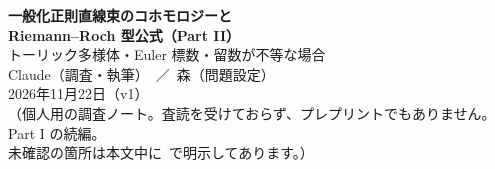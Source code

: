 

\sloppy
\begin{center}
{\LARGE\bfseries\sffamily 一般化正則直線束のコホモロジーと\\[3pt]Riemann--Roch 型公式（Part II）}\\[8pt]
{\large トーリック多様体・Euler 標数・留数が不等な場合}\\[12pt]
{\large Claude（調査・執筆）\ ／\ 森（問題設定）}\\[3pt]
2026年11月22日（v1）\\[3pt]
{\small （個人用の調査ノート。査読を受けておらず、プレプリントでもありません。Part I の続編。\\
未確認の箇所は本文中に\tQ\ で明示してあります。）}
\end{center}
\begin{abstract}\noindent
Part I で得た曲面・トーリックの結果を拡張する。(1) 任意の次元・任意の正則 Poisson 構造で、全複体の Euler 標数が $(-1)^n\rk(E)\chi(X)$ であること（定理 E）。(2) トーリック多様体上の対数 de Rham 複体のコホモロジーを留数から決まる単体複体の被約コホモロジーで書き（定理 C1）、トーリック曲面で留数が不等な場合の Poincaré 多項式の閉公式を得た（定理 C2）。(3) トーリック多様体（任意の偶数次元）の一般的な対数シンプレクティック構造で $\HH^*=H^*(U;L_U)\oplus\C^{\chi(X)}[-n]$（定理 T、仮定の役割の表つき）。(4) 共鳴 $r_i=1$、準斉次な平面曲線の特異点、留数が不等な三重点についての計算に基づく公式（予想を含む）。(5) Part I の記述への影響の確認：撤回すべき主張はなかった。Kodaira 埋め込みの一般化と指数定理は得られていない。
\end{abstract}


